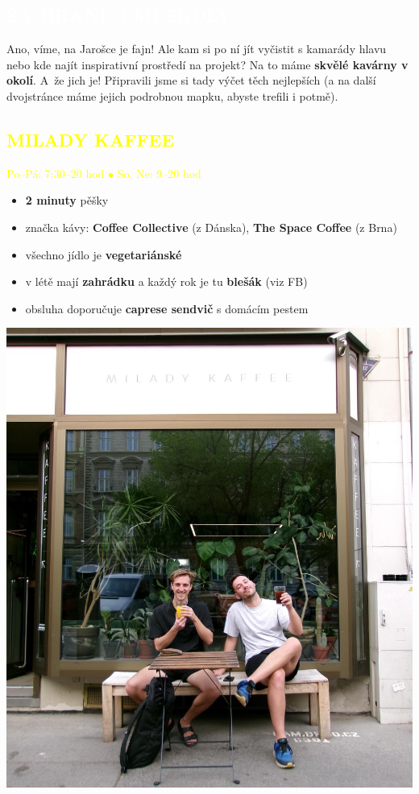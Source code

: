 \documentclass[a5paper, twoside]{article}
\newcommand{\nadpis}[4]{
  \vspace*{-50pt}
  \begin{tcolorbox}[colback = #2, boxrule = 0pt, grow to left by = #4,  grow to right by = #4, arc=8pt, height = 40pt]
    \vspace*{5pt}
    \centering \section*{\textcolor{#3}{#1}}
  \end{tcolorbox}
}
\newcommand{\podnadpis}[2]{
  \subsection*{\textcolor{#2}{#1}}
}
\begin{document}
\nadpis{ZA HRANICEMI ŠKOLY}{yellow}{white}{-2.75cm}

\enlargethispage{\pagegoal}
\noindent \small Ano, víme, na Jarošce je fajn! Ale kam si po ní jít vyčistit s kamarády hlavu nebo kde najít inspirativní prostředí na projekt? Na to máme \textbf{skvělé kavárny v okolí}. A~že jich je! Připravili jsme si tady výčet těch nejlepších (a na další dvojstránce máme jejich podrobnou mapku, abyste trefili i potmě).\\

\noindent
\begin{minipage}{0.7\textwidth}
	\podnadpis{MILADY KAFFEE}{yellow}
	\textcolor{yellow}{Po--Pá: 7:30--20 hod $\bullet$ So, Ne: 9--20 hod}
	\vspace{5pt}
	\small
	\begin{itemize}[leftmargin=10pt]
		\item \textbf{2 minuty} pěšky
		\item značka kávy: \textbf{Coffee Collective} (z Dánska), \textbf{The Space Coffee} (z Brna)
		\item všechno jídlo je \textbf{vegetariánské}
		\item v létě mají \textbf{zahrádku} a každý rok je tu \textbf{blešák} (viz FB)
		\item obsluha doporučuje \textbf{caprese sendvič} s domácím pestem
	\end{itemize}
\end{minipage}
\hfill
\begin{minipage}{0.27\textwidth}
	\includegraphics[width=\linewidth]{milady_kaffee.jpg}
\end{minipage}
\\
\end{document}
